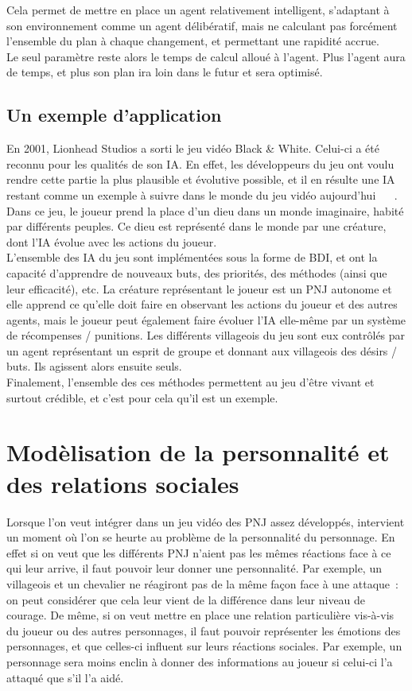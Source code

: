 \documentclass[asi]{picINSAIA}
\begin{document}
Cela permet de mettre en place un agent relativement intelligent, s'adaptant à son environnement comme un agent délibératif, mais ne calculant pas forcément l'ensemble du plan à chaque changement, et permettant une rapidité accrue.\\
Le seul paramètre reste alors le temps de calcul alloué à l'agent. Plus l'agent aura de temps, et plus son plan ira loin dans le futur et sera optimisé.

\section{Un exemple d'application}
En 2001, Lionhead Studios a sorti le jeu vidéo Black \& White. Celui-ci a été reconnu pour les qualités de son IA. En effet, les développeurs du jeu ont voulu rendre cette partie la plus plausible et évolutive possible, et il en résulte une IA restant comme un exemple à suivre dans le monde du jeu vidéo aujourd'hui ~\cite{MindGames} ~\cite{CompGamesWithIntel}.\\
Dans ce jeu, le joueur prend la place d'un dieu dans un monde imaginaire, habité par différents peuples. Ce dieu est représenté dans le monde par une créature, dont l'IA évolue avec les actions du joueur.\\

L'ensemble des IA du jeu sont implémentées sous la forme de BDI, et ont la capacité d'apprendre de nouveaux buts, des priorités, des méthodes (ainsi que leur efficacité), etc. La créature représentant le joueur est un PNJ autonome et elle apprend ce qu'elle doit faire en observant les actions du joueur et des autres agents, mais le joueur peut également faire évoluer l'IA elle-même par un système de récompenses / punitions. Les différents villageois du jeu sont eux contrôlés par un agent représentant un esprit de groupe et donnant aux villageois des désirs / buts. Ils agissent alors ensuite seuls.\\
Finalement, l'ensemble des ces méthodes permettent au jeu d'être vivant et surtout crédible, et c'est pour cela qu'il est un exemple.


\chapter{Modèlisation de la personnalité et des relations sociales}
Lorsque l'on veut intégrer dans un jeu vidéo des PNJ assez développés, intervient un moment où l'on se heurte au problème de la personnalité du personnage. En effet si on veut que les différents PNJ n'aient pas les mêmes réactions face à ce qui leur arrive, il faut pouvoir leur donner une personnalité. Par exemple, un villageois et un chevalier ne réagiront pas de la même façon face à une attaque : on peut considérer que cela leur vient de la différence dans leur niveau de courage. De même, si on veut mettre en place une relation particulière vis-à-vis du joueur ou des autres personnages, il faut pouvoir représenter les émotions des personnages, et que celles-ci influent sur leurs réactions sociales. Par exemple, un personnage sera moins enclin à donner des informations au joueur si celui-ci l'a attaqué que s’il l'a aidé. 
\end{document}
